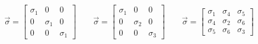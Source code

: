 \begin{equation}
\begin{aligned}
\vec{\sigma} = \left[\begin{matrix}
    \sigma_{1} & 0 & 0 \\ 0 & \sigma_{1} & 0 \\ 0 & 0 & \sigma_{1}
\end{matrix}\right]
\qquad
\vec{\sigma} = \left[\begin{matrix}
    \sigma_{1} & 0 & 0 \\ 0 & \sigma_{2} & 0 \\ 0 & 0 & \sigma_{3}
\end{matrix}\right]
\qquad
\vec{\sigma} = \left[\begin{matrix}
    \sigma_{1} & \sigma_{4} & \sigma_{5} \\ \sigma_{4} & \sigma_{2} & \sigma_{6} \\ \sigma_{5} & \sigma_{6} & \sigma_{3}
\end{matrix}\right]
\end{aligned}
\end{equation}
